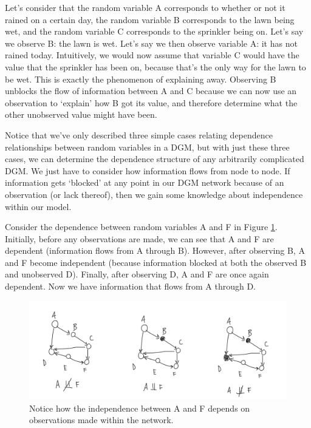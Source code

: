 Let's consider that the random variable A corresponds to whether or not it rained on a certain day, the random variable B corresponds to the lawn being wet, and the random variable C corresponds to the sprinkler being on. Let's say we observe B: the lawn is wet. Let's say we then observe variable A: it has not rained today. Intuitively, we would now assume that variable C would have the value that the sprinkler has been on, because that's the only way for the lawn to be wet. This is exactly the phenomenon of explaining away. Observing B unblocks the flow of information between A and C because we can now use an observation to `explain' how B got its value, and therefore determine what the other unobserved value might have been.

Notice that we've only described three simple cases relating dependence relationships between random variables in a DGM, but with just these three cases, we can determine the dependence structure of any arbitrarily complicated DGM. We just have to consider how information flows from node to node. If information gets `blocked' at any point in our DGM network because of an observation (or lack thereof), then we gain some knowledge about independence within our model.

Consider the dependence between random variables A and F in Figure \ref{fig:information-flow-example}. Initially, before any observations are made, we can see that A and F are dependent (information flows from A through B). However, after observing B, A and F become independent (because information blocked at both the observed B and unobserved D). Finally, after observing D, A and F are once again dependent. Now we have information that flows from A through D.
\begin{figure}
	\centering
	\includegraphics[width=0.5\paperwidth]{../GraphicalModels/fig/information-flow-example.png}
    \caption{Notice how the independence between A and F depends on observations made within the network.}
	\label{fig:information-flow-example}
\end{figure}

